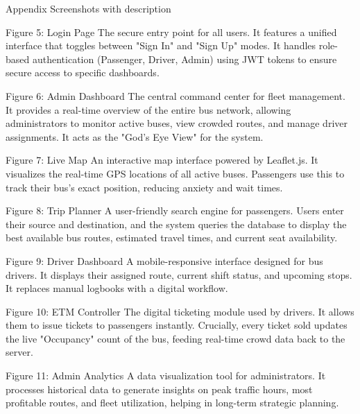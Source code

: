                                                               Appendix
Screenshots with description

 
Figure 5: Login Page 
The secure entry point for all users. It features a unified interface that toggles between "Sign In" and "Sign Up" modes. It handles role-based authentication (Passenger, Driver, Admin) using JWT tokens to ensure secure access to specific dashboards.

 
Figure 6: Admin Dashboard
The central command center for fleet management. It provides a real-time overview of the entire bus network, allowing administrators to monitor active buses, view crowded routes, and manage driver assignments. It acts as the "God's Eye View" for the system.





          
Figure 7: Live Map 
An interactive map interface powered by Leaflet.js. It visualizes the real-time GPS locations of all active buses. Passengers use this to track their bus's exact position, reducing anxiety and wait times.
 

                                                                  
Figure 8: Trip Planner 
A user-friendly search engine for passengers. Users enter their source and destination, and the system queries the database to display the best available bus routes, estimated travel times, and current seat availability.


 
Figure 9: Driver Dashboard 
A mobile-responsive interface designed for bus drivers. It displays their assigned route, current shift status, and upcoming stops. It replaces manual logbooks with a digital workflow.


 
Figure 10:  ETM Controller 
The digital ticketing module used by drivers. It allows them to issue tickets to passengers instantly. Crucially, every ticket sold updates the live "Occupancy" count of the bus, feeding real-time crowd data back to the server.
 
Figure 11: Admin Analytics 
A data visualization tool for administrators. It processes historical data to generate insights on peak traffic hours, most profitable routes, and fleet utilization, helping in long-term strategic planning.



	               






